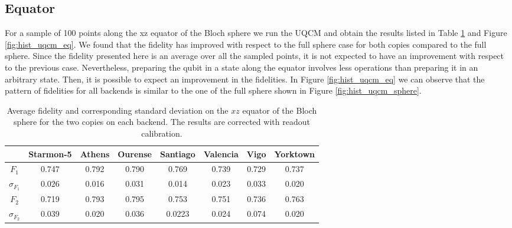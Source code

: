 \subsection{Equator}

For a sample of 100 points along the xz equator of the Bloch sphere we run the UQCM and obtain the results listed in Table \ref{tab:uqcm_results_eq} and Figure \ref{fig:hist_uqcm_eq}. We found that the fidelity has improved with respect to the full sphere case for both copies compared to the full sphere. Since the fidelity presented here is an average over all the sampled points, it is not expected to have an improvement with respect to the previous case. Nevertheless, preparing the qubit in a state along the equator involves less operations than preparing it in an arbitrary state. Then, it is possible to expect an improvement in the fidelities. In Figure \ref{fig:hist_uqcm_eq} we can observe that the pattern of fidelities for all backends is similar to the one of the full sphere shown in Figure \ref{fig:hist_uqcm_sphere}.

\begin{table}[H]
    \centering
    \begin{tabular}{|c|c|c|c|c|c|c|c|}
    \hline
    \textbf{} & \textbf{Starmon-5} & \textbf{Athens} & \textbf{Ourense} & \textbf{Santiago} & \textbf{Valencia} & \textbf{Vigo} & \textbf{Yorktown} \\ \hline
    $F_1$              & 0.747 & 0.792 & 0.790 & 0.769 & 0.739 & 0.729 & 0.737\\ \hline
    $\sigma_{F_1}$     & 0.026 & 0.016 & 0.031 &0.014  & 0.023 & 0.033 & 0.020 \\ \hline
    $F_2$              & 0.719 & 0.793 & 0.795 & 0.753 & 0.751 & 0.736 & 0.763 \\ \hline
    $\sigma_{F_2}$     & 0.039 & 0.020 & 0.036 & 0.0223 & 0.024 & 0.074 & 0.020 \\ \hline
    \end{tabular}
    \caption{Average fidelity and corresponding standard deviation on the $xz$ equator of the Bloch sphere for the two copies on each backend. The results are corrected with readout calibration.}\label{tab:uqcm_results_eq}
\end{table}

